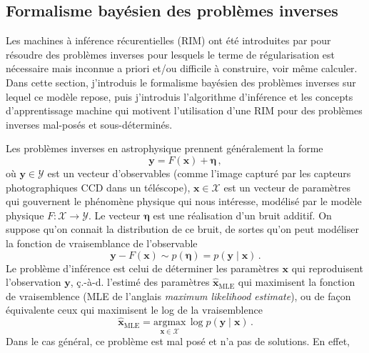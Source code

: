 \subsection{Formalisme bayésien des problèmes inverses}

Les machines à inférence récurentielles (RIM) ont été introduites par \citet{Putzky2017} pour résoudre des problèmes 
inverses pour lesquels le terme de régularisation est nécessaire mais inconnue a priori et/ou difficile à 
construire, voir même calculer. Dans cette section, j'introduis le formalisme bayésien des problèmes inverses sur lequel 
ce modèle repose, puis j'introduis l'algorithme d'inférence et les concepts d'apprentissage machine qui motivent 
l'utilisation d'une RIM pour des problèmes inverses mal-posés et sous-déterminés.

Les problèmes inverses en astrophysique prennent généralement la forme
\begin{equation}\label{eq:inverse problem lineaire}
       \mathbf{y} = F(\mathbf{x}) + \boldsymbol{\eta}\, ,
\end{equation} 
où $\mathbf{y}\in \mathcal{Y}$ est un vecteur d'observables (comme l'image capturé par les capteurs photographiques CCD dans un téléscope), 
$\mathbf{x}\in\mathcal{X}$ est un vecteur de paramètres qui gouvernent le phénomène physique qui nous intéresse, 
modélisé par le modèle physique $F:\mathcal{X} \rightarrow \mathcal{Y}$.
Le vecteur $\boldsymbol{\eta}$ est une réalisation d'un bruit additif. 
On suppose qu'on connait la distribution de ce bruit, de sortes qu'on peut modéliser la fonction de vraisemblance de l'observable
\begin{equation}\label{eq:likelihood intro}
        \mathbf{y} - F(\mathbf{x}) \sim p(\boldsymbol{ \eta}) = p(\mathbf{y} \mid \mathbf{x})\, .
\end{equation} 
Le problème d'inférence est celui de déterminer les paramètres $\mathbf{x}$ qui reproduisent l'observation $\mathbf{y}$, 
ç.-à-d. l'estimé des paramètres $\hat{\mathbf{x}}_{\mathrm{MLE}}$ 
qui maximisent la fonction de vraisemblence (MLE de l'anglais \textit{maximum likelihood estimate}), 
ou de façon équivalente ceux qui maximisent le log de la vraisemblence
\begin{equation}\label{eq:likelihood max}
        \hat{\mathbf{x}}_{\mathrm{MLE}} = \underset{\mathbf{x} \in \mathcal{X}}{\mathrm{argmax}}\, \log p(\mathbf{y} \mid \mathbf{x})\, .
\end{equation} 
Dans le cas général, ce problème est mal posé et n'a pas de solutions. En effet, 
